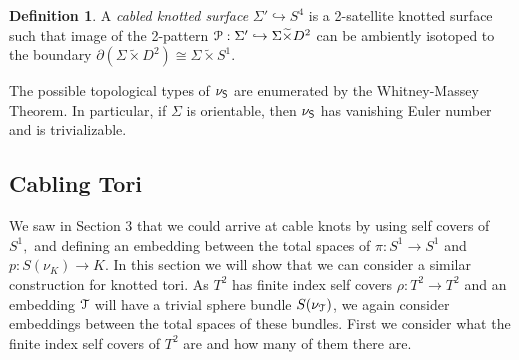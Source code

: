 \documentclass[a4paper, 12 pt, reqno]{amsart}
\theoremstyle{definition}
\newtheorem{definition}[theorem]{Definition}
\theoremstyle{remark}
\begin{document}


\begin{definition}
A {\em cabled knotted surface} $\Sigma' \hookrightarrow S^4$ is a 2-satellite knotted surface such that image of the 2-pattern $\mathcal P : \Sigma' \hookrightarrow \Sigma \widetilde{\times} D^2$ can be ambiently isotoped to the boundary $\partial (\Sigma \widetilde{\times} D^2) \cong \Sigma \widetilde{\times} S^1$.
\end{definition}

The possible topological types of $\nu_{\mathsf S}$ are enumerated by the Whitney-Massey Theorem. In particular, if $\Sigma$ is orientable, then $\nu_{\mathsf S}$ has vanishing Euler number and is trivializable. 
 


\subsection{Cabling Tori}
We saw in Section 3 that we could arrive at cable knots by using self covers of $S^{1},$ and defining an embedding between the total spaces of $\pi: S^{1} \rightarrow S^{1}$ and $p: S(\nu_{K}) \rightarrow K.$ In this section we will show that we can consider a similar construction for knotted tori. As $T^{2}$ has finite index self covers $\rho: T^{2} \rightarrow T^{2}$ and an embedding $\mathcal T$ will have a trivial sphere bundle $S(\nu_{\mathcal T})$, we again consider embeddings between the total spaces of these bundles. First we consider what the finite index self covers of $T^{2}$ are and how many of them there are.
\end{document}
